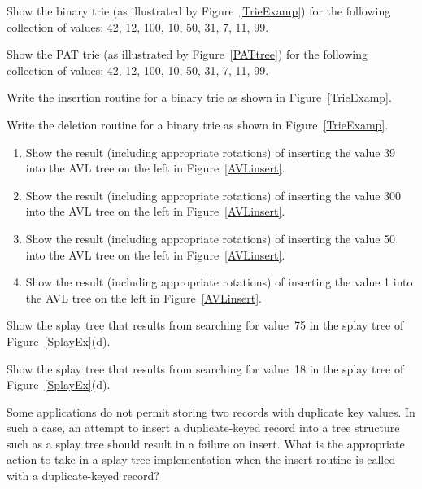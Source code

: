 \begin{exercises}

\item
Show the binary trie (as illustrated by Figure~\ref{TrieExamp})
for the following collection of values: 42, 12, 100, 10, 50, 31, 7,
11, 99.

\item
Show the PAT trie (as illustrated by Figure~\ref{PATtree})
for the following collection of values: 42, 12, 100, 10, 50, 31, 7,
11, 99.

\item
Write the insertion routine for a binary trie as shown in
Figure~\ref{TrieExamp}.

\item
Write the deletion routine for a binary trie as shown in
Figure~\ref{TrieExamp}.

\item
\begin{enumerate}
\item Show the result (including appropriate rotations) of inserting
the value 39 into the AVL tree on the left in Figure~\ref{AVLinsert}.
\item Show the result (including appropriate rotations) of inserting
the value 300 into the AVL tree on the left in Figure~\ref{AVLinsert}.
\item Show the result (including appropriate rotations) of inserting
the value 50 into the AVL tree on the left in Figure~\ref{AVLinsert}.
\item Show the result (including appropriate rotations) of inserting
the value 1 into the AVL tree on the left in Figure~\ref{AVLinsert}.
\end{enumerate}

\item
Show the splay tree that results from searching for value~75 in the
splay tree of Figure~\ref{SplayEx}(d).

\item
Show the splay tree that results from searching for value~18 in the
splay tree of Figure~\ref{SplayEx}(d).

\item
Some applications do not permit storing two records with
duplicate key values.
In such a case, an attempt to insert a duplicate-keyed record into a
tree structure such as a splay tree should result in a failure on
insert.
What is the appropriate action to take in a splay tree implementation
when the insert routine is called with a duplicate-keyed record?


\end{exercises}
